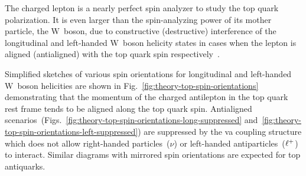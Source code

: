 The charged lepton is a nearly perfect spin analyzer to study the top quark polarization. It is even larger than the spin-analyzing power of its mother particle, the $\mathrm{W}$~boson, due to constructive (destructive) interference of the longitudinal and left-handed $\mathrm{W}$~boson helicity states in cases when the lepton is aligned (antialigned) with the top quark spin respectively~\cite{Bernreuther:2008ju}.


Simplified sketches of various spin orientations for longitudinal and left-handed $\mathrm{W}$~boson helicities are shown in Fig.~\ref{fig:theory-top-spin-orientations} demonstrating that the momentum of the charged antilepton in the top quark rest frame tends to be aligned along the top quark spin. Antialigned scenarios~(Figs.~\ref{fig:theory-top-spin-orientations-long-suppressed} and~\ref{fig:theory-top-spin-orientations-left-suppressed}) are suppressed by the \gls{va} coupling structure which does not allow right-handed particles~($\nu$) or left-handed antiparticles~($\ell^{+}$) to interact. Similar diagrams with mirrored spin orientations are expected for top antiquarks.

